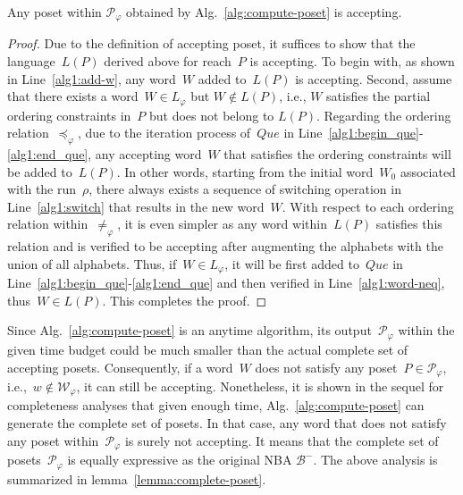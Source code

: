 \begin{lemma}\label{lemma:accepting-poset}
Any poset within $\mathcal{P}_{\varphi}$ obtained by Alg.~\ref{alg:compute-poset}
is accepting.
\end{lemma}
\begin{proof}
Due to the definition of accepting poset, it suffices to show that the
language~$L(P)$ derived above for reach~$P$ is accepting.
To begin with, as shown in Line~\ref{alg1:add-w}, any word~$W$ added to~$L(P)$
is accepting.
Second, assume that there exists a word~$W\in L_\varphi$ but $W\notin L(P)$, i.e.,
$W$ satisfies the partial ordering constraints in~$P$ but does not belong to $L(P)$.
Regarding the ordering relation~$\preceq_{\varphi}$,
due to the iteration process of~$Que$ in Line~\ref{alg1:begin_que}-\ref{alg1:end_que},
any accepting word~$W$ that satisfies the ordering constraints will be added
to~$L(P)$.
In other words, starting from the initial word~$W_0$ associated with the run~$\rho$,
there always exists a sequence of switching operation in Line~\ref{alg1:switch} that results
in the new word~$W$.
With respect to each ordering relation within~$\neq_{\varphi}$, it is even simpler
as any word within~$L(P)$ satisfies this relation and is verified to be accepting
after augmenting the alphabets with the union of all alphabets.
Thus, if~$W\in L_{\varphi}$, it will be first added to~$Que$ in
Line~\ref{alg1:begin_que}-\ref{alg1:end_que} and then
verified in Line~\ref{alg1:word-neq}, thus~$W\in L(P)$. This completes the proof.
\end{proof}



Since Alg.~\ref{alg:compute-poset} is an anytime algorithm,
its output~$\mathcal{P}_{\varphi}$ within the given time budget
could be much smaller than the actual complete set of accepting posets.
Consequently, if a word~$W$ does not satisfy
any poset~$P\in \mathcal{P}_{\varphi}$, i.e.,~$w\notin \mathcal{W}_{\varphi}$,
it can still be accepting.
Nonetheless, it is shown in the sequel for completeness analyses that
given enough time, Alg.~\ref{alg:compute-poset} can generate
the complete set of posets.
In that case, any word that does not satisfy any poset
within~$\mathcal{P}_{\varphi}$ is surely not accepting.
It means that the complete set of posets~$\mathcal{P}_{\varphi}$ is
equally expressive as the original NBA $\mathcal{B}^-$.
The above analysis is summarized in lemma~\ref{lemma:complete-poset}.

